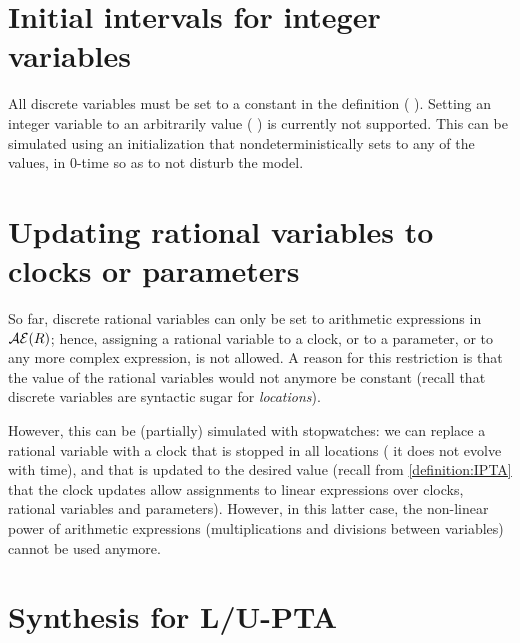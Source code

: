 

\section{Initial intervals for integer variables}

All discrete variables must be set to a constant in the  definition (\eg{} ).
Setting an integer variable to an arbitrarily value (\eg{} ) is currently not supported.
This can be simulated using an initialization \IPTA{} that nondeterministically sets  to any of the values, in 0-time so as to not disturb the model.


\section{Updating rational variables to clocks or parameters}

So far, discrete rational variables can only be set to arithmetic expressions in $\mathcal{AE}(R)$;
hence, assigning a rational variable to a clock, or to a parameter, or to any more complex expression, is not allowed.
A reason for this restriction is that the value of the rational variables would not anymore be constant (recall that discrete variables are syntactic sugar for \emph{locations}).

However, this can be (partially) simulated with stopwatches: we can replace a rational variable with a clock that is stopped in all locations (\ie{} it does not evolve with time), and that is updated to the desired value (recall from \cref{definition:IPTA} that the clock updates allow assignments to linear expressions over clocks, rational variables and parameters).
However, in this latter case, the non-linear power of arithmetic expressions (multiplications and divisions between variables) cannot be used anymore.



\section{Synthesis for L/U-PTA}

